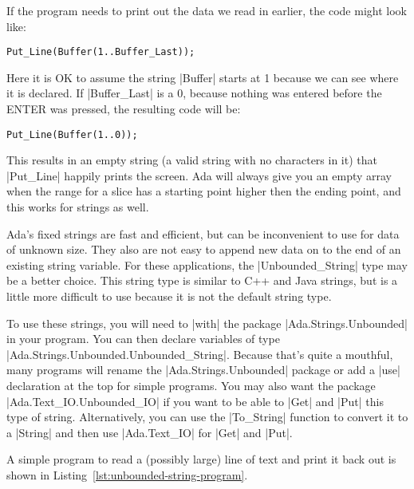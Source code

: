 If the program needs to print out the data we read in earlier, the code might look like:

\begin{lstlisting}
Put_Line(Buffer(1..Buffer_Last));
\end{lstlisting}

\noindent Here it is OK to assume the string |Buffer| starts at 1 because we can see where it is
declared. If |Buffer_Last| is a 0, because nothing was entered before the ENTER was pressed, the
resulting code will be:

\begin{lstlisting}
Put_Line(Buffer(1..0));
\end{lstlisting}

\noindent This results in an empty string (a valid string with no characters in it) that
|Put_Line| happily prints the screen. Ada will always give you an empty array when the range for
a slice has a starting point higher then the ending point, and this works for strings as well.

Ada's fixed strings are fast and efficient, but can be inconvenient to use for data of unknown
size. They also are not easy to append new data on to the end of an existing string variable.
For these applications, the |Unbounded_String| type may be a better choice. This string type is
similar to C++ and Java strings, but is a little more difficult to use because it is not the
default string type.

To use these strings, you will need to |with| the package |Ada.Strings.Unbounded| in your
program. You can then declare variables of type |Ada.Strings.Unbounded.Unbounded_String|.
Because that's quite a mouthful, many programs will rename the |Ada.Strings.Unbounded| package
or add a |use| declaration at the top for simple programs. You may also want the package
|Ada.Text_IO.Unbounded_IO| if you want to be able to |Get| and |Put| this type of string.
Alternatively, you can use the |To_String| function to convert it to a |String| and then use
|Ada.Text_IO| for |Get| and |Put|.

A simple program to read a (possibly large) line of text and print it back out is shown in
Listing~\ref{lst:unbounded-string-program}.

